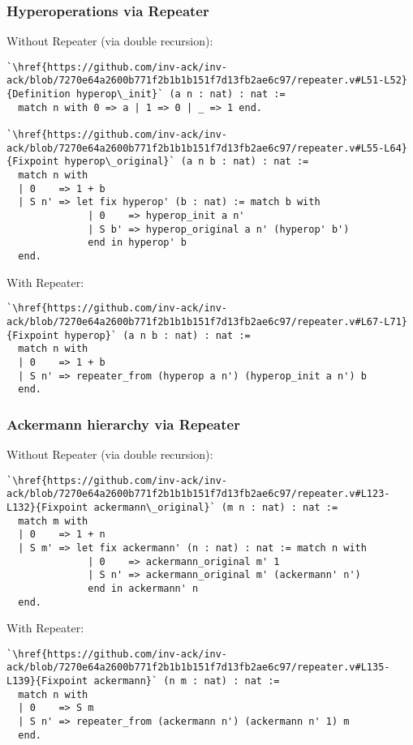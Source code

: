 \begin{frame}[fragile]
\frametitle{Hyperoperations via Repeater}
Without Repeater (via double recursion):
\begin{lstlisting}
`\href{https://github.com/inv-ack/inv-ack/blob/7270e64a2600b771f2b1b1b151f7d13fb2ae6c97/repeater.v#L51-L52}{Definition hyperop\_init}` (a n : nat) : nat :=
  match n with 0 => a | 1 => 0 | _ => 1 end.

`\href{https://github.com/inv-ack/inv-ack/blob/7270e64a2600b771f2b1b1b151f7d13fb2ae6c97/repeater.v#L55-L64}{Fixpoint hyperop\_original}` (a n b : nat) : nat :=
  match n with
  | 0    => 1 + b
  | S n' => let fix hyperop' (b : nat) := match b with
              | 0    => hyperop_init a n'
              | S b' => hyperop_original a n' (hyperop' b')
              end in hyperop' b
  end.
\end{lstlisting}

With Repeater:
\begin{lstlisting} 
`\href{https://github.com/inv-ack/inv-ack/blob/7270e64a2600b771f2b1b1b151f7d13fb2ae6c97/repeater.v#L67-L71}{Fixpoint hyperop}` (a n b : nat) : nat :=
  match n with
  | 0    => 1 + b
  | S n' => repeater_from (hyperop a n') (hyperop_init a n') b
  end.
\end{lstlisting}
\end{frame}


\begin{frame}[fragile]
\frametitle{Ackermann hierarchy via Repeater}
Without Repeater (via double recursion):
\begin{lstlisting}
`\href{https://github.com/inv-ack/inv-ack/blob/7270e64a2600b771f2b1b1b151f7d13fb2ae6c97/repeater.v#L123-L132}{Fixpoint ackermann\_original}` (m n : nat) : nat :=
  match m with
  | 0    => 1 + n
  | S m' => let fix ackermann' (n : nat) : nat := match n with
              | 0    => ackermann_original m' 1
              | S n' => ackermann_original m' (ackermann' n')
              end in ackermann' n
  end.
\end{lstlisting}

With Repeater:
\begin{lstlisting}
`\href{https://github.com/inv-ack/inv-ack/blob/7270e64a2600b771f2b1b1b151f7d13fb2ae6c97/repeater.v#L135-L139}{Fixpoint ackermann}` (n m : nat) : nat :=
  match n with
  | 0    => S m
  | S n' => repeater_from (ackermann n') (ackermann n' 1) m
  end.
\end{lstlisting}
\end{frame}

%

